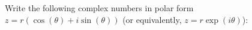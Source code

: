 

\begin{questions}
\question Write the following complex numbers in polar form $z=r \left( \cos ( \theta)+ i \sin (\theta) \right)$ (or equivalently, $z=r \exp \left(i \theta \right)$):


\end{questions}
